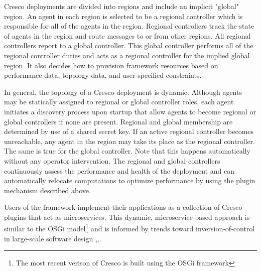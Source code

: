 \documentclass{article}
\begin{document}
	Cresco deployments are divided into regions and include an implicit "global" region. An agent in each region is selected to be a regional controller which is responsible for all of the agents in the region. Regional controllers track the state of  agents in the region and route messages to or from other regions. All regional controllers report to a global controller. This global controller performs all of the regional controller duties and acts as a regional controller for the implied global region. It also decides how to provision framework resources based on performance data, topology data, and user-specified constraints.
	
	In general, the topology of a Cresco deployment is dynamic. Although agents may be statically assigned to regional or global controller roles, each agent initiates a discovery process upon startup that allow agents to become regional or global controllers if none are present. Regional and global membership are determined by use of a shared secret key. If an active regional controller becomes unreachable, any agent in the region may take its place as the regional controller. The same is true for the global controller. Note that this happens automatically without any operator intervention. The regional and global controllers continuously assess the performance and health of the deployment and can automatically relocate computations to optimize performance by using the plugin mechanism described above.
	
    Users of the framework implement their applications as a collection of Cresco plugins that act as microservices. This dynamic, microservice-based approach is similar to the OSGi model\footnote{The most recent verison of Cresco is built using the OSGi framework} and is informed by trends toward inversion-of-control in large-scale software design \cite{osgi},\cite{spring},\cite{kubernetes}. 
	
	
	
	
	
	
\end{document}

